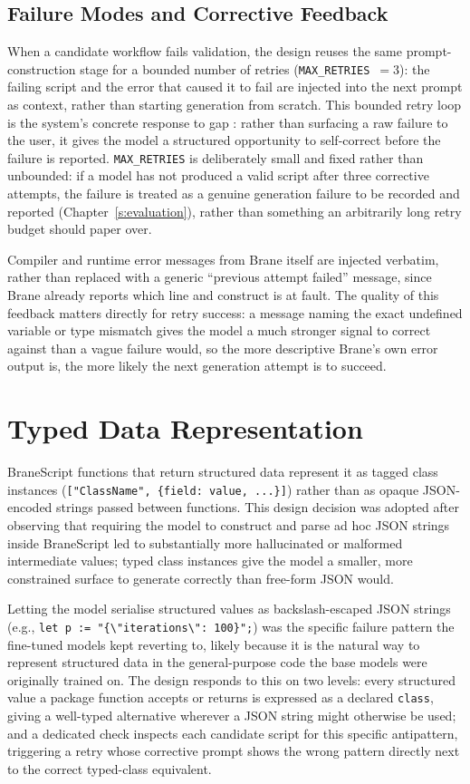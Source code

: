 \subsection{Failure Modes and Corrective Feedback}
When a candidate workflow fails validation, the design reuses the same
prompt-construction stage for a bounded number of retries
(\texttt{MAX\_RETRIES}~$=3$): the failing script and
the error that caused it to fail are injected into the next prompt as
context, rather than starting generation from scratch. This bounded retry
loop is the system's concrete response to gap : rather than
surfacing a raw failure to the user, it gives the model a structured
opportunity to self-correct before the failure is reported. \texttt{MAX\_RETRIES}
is deliberately small and fixed rather than unbounded: if a model has not
produced a valid script after three corrective attempts, the failure is
treated as a genuine generation failure to be recorded and reported
(Chapter~\ref{s:evaluation}), rather than something an arbitrarily long retry
budget should paper over.

Compiler and runtime error messages from Brane itself are injected verbatim,
rather than replaced with a generic ``previous attempt failed'' message,
since Brane already reports which line and construct is at fault. The
quality of this feedback matters directly for retry success: a message
naming the exact undefined variable or type mismatch gives the model a much
stronger signal to correct against than a vague failure would, so the more
descriptive Brane's own error output is, the more likely the next generation
attempt is to succeed.

\section{Typed Data Representation}\label{s:typed-data}

BraneScript functions that return structured data represent it as tagged class
instances (\texttt{["ClassName", \{field: value, ...\}]}) rather than as
opaque JSON-encoded strings passed between functions. This design decision was
adopted after observing that requiring the model to construct and parse ad hoc
JSON strings inside BraneScript led to substantially more hallucinated or
malformed intermediate values; typed class instances give the model a
smaller, more constrained surface to generate correctly than free-form JSON
would.

Letting the model serialise structured values as backslash-escaped JSON strings (e.g.,
\texttt{let p := "\{\textbackslash"iterations\textbackslash": 100\}";}) 
was the specific failure pattern the fine-tuned models kept reverting to,
likely because it is the natural way to represent structured data in the
general-purpose code the base models were originally trained on. The design
responds to this on two levels: every structured value a package function
accepts or returns is expressed as a declared \texttt{class}, giving a
well-typed alternative wherever a JSON string might otherwise be used; and a
dedicated check inspects each candidate script for this specific
antipattern, triggering a retry whose corrective prompt shows the wrong
pattern directly next to the correct typed-class equivalent.


